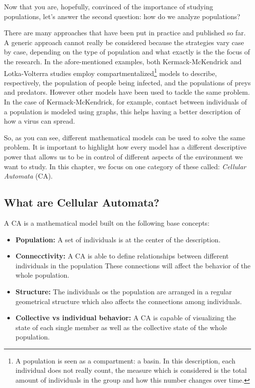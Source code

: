 Now that you are, hopefully, convinced of the importance of studying populations, let's answer the
second question: how do we analyze populations?

There are many approaches that have been put in practice and published so far. A generic approach cannot
really be considered because the strategies vary case by case, depending on the type of population
and what exactly is the the focus of the research. In the afore-mentioned examples, both
Kermack-McKendrick and Lotka-Volterra studies employ
compartmentalized\footnote{A population is seen as a compartment: a basin. In this description, each
individual does not really count, the measure which is considered is the total amount of individuals
in the group and how this number changes over time.}
models to describe,
respectively, the population of people being infected, and the populations of preys and predators.
However other models have been used to tackle the same problem. In the case of Kermack-McKendrick,
for example, contact between individuals of a population is modeled using graphs, this helps
having a better description of how a virus can spread.

So, as you can see, different mathematical models can be used to solve the same problem. 
It is important to highlight how every model has a different descriptive power that allows us to
be in control of different aspects of the environment we want to study. In this chapter,
we focus on one category of these called: \textit{Cellular Automata} (CA).

\subsection{What are Cellular Automata?}
A CA is a mathematical model built on the following base concepts:

\begin{itemize}
\item \textbf{Population:} A set of individuals is at the center of the description.
\item \textbf{Connecctivity:} A CA is able to define relationships between different individuals in
the population These connections will affect the behavior of the whole population.
\item \textbf{Structure:} The individuals os the population are arranged in a regular geometrical structure
which also affects the connections among individuals.
\item \textbf{Collective vs individual behavior:} A CA is capable of visualizing the state of each single
member as well as the collective state of the whole population.
\end{itemize}

